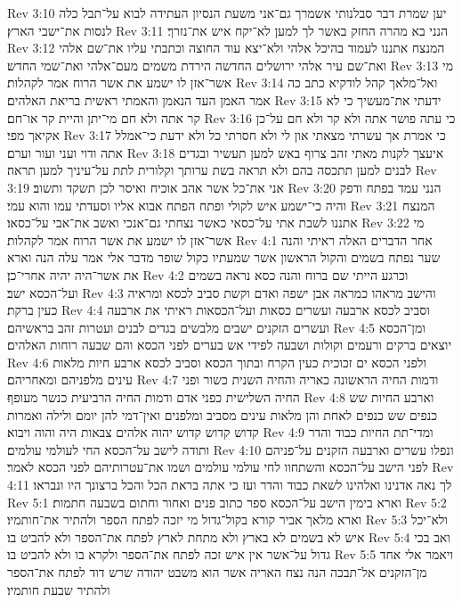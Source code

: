 Rev 3:10  יען שמרת דבר סבלנותי אשמרך גם־אני משעת הנסיון העתידה לבוא על־תבל כלה לנסות את־ישבי הארץ׃
Rev 3:11  הנני בא מהרה החזק באשר לך למען לא־יקח איש את־נזרך׃
Rev 3:12  המנצח אתננו לעמוד בהיכל אלהי ולא־יצא עוד החוצה וכתבתי עליו את־שם אלהי ואת־שם עיר אלהי ירושלים החדשה הירדת משמים מעם־אלהי ואת־שמי החדש׃
Rev 3:13  מי אשר־אזן לו ישמע את אשר הרוח אמר לקהלות׃
Rev 3:14  ואל־מלאך קהל לודקיא כתב כה אמר האמן העד הנאמן והאמתי ראשית בריאת האלהים׃
Rev 3:15  ידעתי את־מעשיך כי לא קר אתה ולא חם מי־יתן והיית קר או־חם׃
Rev 3:16  כי עתה פושר אתה ולא קר ולא חם על־כן אקיאך מפי׃
Rev 3:17  כי אמרת אך עשרתי מצאתי און לי ולא חסרתי כל ולא ידעת כי־אמלל אתה ודוי ועני ועור וערם׃
Rev 3:18  איעצך לקנות מאתי זהב צרוף באש למען תעשיר ובגדים לבנים למען תתכסה בהם ולא תראה בשת ערותך וקלורית לתת על־עיניך למען תראה׃
Rev 3:19  אני את־כל אשר אהב אוכיח ואיסר לכן תשקד ותשוב׃
Rev 3:20  הנני עמד בפתח ודפק והיה כי־ישמע איש לקולי ופתח הפתח אבוא אליו וסעדתי עמו והוא עמי׃
Rev 3:21  המנצח אתננו לשבת אתי על־כסאי כאשר נצחתי גם־אנכי ואשב את־אבי על־כסאו׃
Rev 3:22  מי אשר־אזן לו ישמע את אשר הרוח אמר לקהלות׃
Rev 4:1  אחר הדברים האלה ראיתי והנה שער נפתח בשמים והקול הראשון אשר שמעתיו כקול שופר מדבר אלי אמר עלה הנה וארא את אשר־היה יהיה אחרי־כן׃
Rev 4:2  וכרגע הייתי שם ברוח והנה כסא נראה בשמים ועל־הכסא ישב׃
Rev 4:3  והישב מראהו כמראה אבן ישפה ואדם וקשת סביב לכסא ומראיה כעין ברקת׃
Rev 4:4  וסביב לכסא ארבעה ועשרים כסאות ועל־הכסאות ראיתי את ארבעה ועשרים הזקנים ישבים מלבשים בגדים לבנים ועטרות זהב בראשיהם׃
Rev 4:5  ומן־הכסא יוצאים ברקים ורעמים וקולות ושבעה לפידי אש בערים לפני הכסא והם שבעה רוחות האלהים׃
Rev 4:6  ולפני הכסא ים זכוכית כעין הקרח ובתוך הכסא וסביב לכסא ארבע חיות מלאות עינים מלפניהם ומאחריהם׃
Rev 4:7  ודמות החיה הראשונה כאריה והחיה השנית כשור ופני החיה השלישית כפני אדם ודמות החיה הרביעית כנשר מעופף׃
Rev 4:8  וארבע החיות שש כנפים שש כנפים לאחת והן מלאות עינים מסביב ומלפנים ואין־דמי להן יומם ולילה ואמרות קדוש קדוש קדוש יהוה אלהים צבאות היה והוה ויבוא׃
Rev 4:9  ומדי־תת החיות כבוד והדר ותודה לישב על־הכסא החי לעולמי עולמים׃
Rev 4:10  ונפלו עשרים וארבעה הזקנים על־פניהם לפני הישב על־הכסא והשתחוו לחי עולמי עולמים ושמו את־עטרותיהם לפני הכסא לאמר׃
Rev 4:11  לך נאה אדנינו ואלהינו לשאת כבוד והדר ועז כי אתה בראת הכל והכל ברצונך היו ונבראו׃
Rev 5:1  וארא בימין הישב על־הכסא ספר כתוב פנים ואחור וחתום בשבעה חתמות׃
Rev 5:2  וארא מלאך אביר קורא בקול־גדול מי יזכה לפתח הספר ולהתיר את־חותמיו׃
Rev 5:3  ולא־יכל איש לא בשמים לא בארץ ולא מתחת לארץ לפתח את־הספר ולא להביט בו׃
Rev 5:4  ואב בכי גדול על־אשר אין איש זכה לפתח את־הספר ולקרא בו ולא להביט בו׃
Rev 5:5  ויאמר אלי אחד מן־הזקנים אל־תבכה הנה נצח האריה אשר הוא משבט יהודה שרש דוד לפתח את־הספר ולהתיר שבעת חותמיו׃

